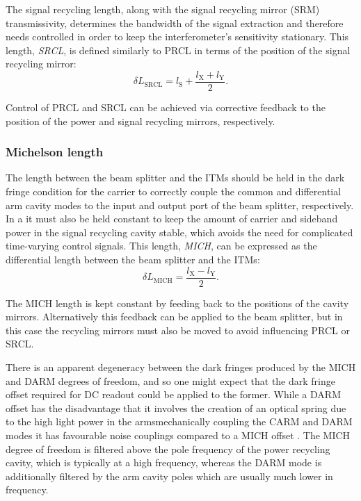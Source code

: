The signal recycling length, along with the signal recycling mirror (\gls{SRM}) transmissivity, determines the bandwidth of the signal extraction and therefore needs controlled in order to keep the interferometer's sensitivity stationary. This length, \emph{\gls{SRCL}}, is defined similarly to \gls{PRCL} in terms of the position of the signal recycling mirror:
\begin{equation}
  \label{eq:srcl-length}
  \delta L_{\text{SRCL}} = l_{\text{S}} + \frac{l_{\text{X}} + l_{\text{Y}}}{2}.
\end{equation}

Control of \gls{PRCL} and \gls{SRCL} can be achieved via corrective feedback to the position of the power and signal recycling mirrors, respectively.

\subsubsection{\label{sec:mich-length}Michelson length}
The length between the beam splitter and the \glspl{ITM} should be held in the dark fringe condition for the carrier to correctly couple the common and differential arm cavity modes to the input and output port of the beam splitter, respectively. In a \DRFPMI{} it must also be held constant to keep the amount of carrier and sideband power in the signal recycling cavity stable, which avoids the need for complicated time-varying control signals. This length, \emph{\gls{MICH}}, can be expressed as the differential length between the beam splitter and the \glspl{ITM}:
\begin{equation}
  \label{eq:mich-length}
  \delta L_{\text{MICH}} = \frac{l_{\text{X}} - l_{\text{Y}}}{2}.
\end{equation}

The \gls{MICH} length is kept constant by feeding back to the positions of the cavity mirrors. Alternatively this feedback can be applied to the beam splitter, but in this case the recycling mirrors must also be moved to avoid influencing \gls{PRCL} or \gls{SRCL}.

There is an apparent degeneracy between the dark fringes produced by the \gls{MICH} and \gls{DARM} degrees of freedom, and so one might expect that the dark fringe offset required for \gls{DC} readout could be applied to the former. While a \gls{DARM} offset has the disadvantage that it involves the creation of an optical spring due to the high light power in the arms\textemdash mechanically coupling the \gls{CARM} and \gls{DARM} modes \cite{Heidmann2011, Vostrosablin2014}\textemdash it has favourable noise couplings compared to a \gls{MICH} offset \cite{Vajente2011}. The \gls{MICH} degree of freedom is filtered above the pole frequency of the power recycling cavity, which is typically at a high frequency, whereas the \gls{DARM} mode is additionally filtered by the arm cavity poles which are usually much lower in frequency.


